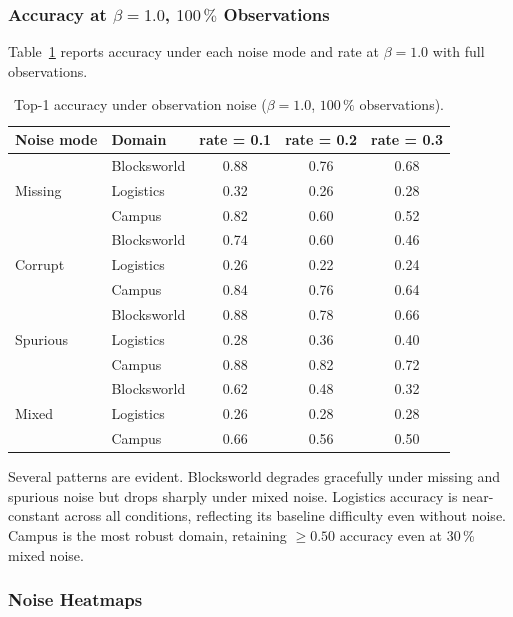 \documentclass[11pt,a4paper]{article}
\begin{document}
\subsubsection{Accuracy at $\beta = 1.0$, $100\,\%$ Observations}

Table~\ref{tab:noise_accuracy} reports accuracy under each noise mode
and rate at $\beta = 1.0$ with full observations.

\begin{table}[H]
\centering
\caption{Top-1 accuracy under observation noise ($\beta = 1.0$, $100\,\%$ observations).}
\label{tab:noise_accuracy}
\setlength{\tabcolsep}{5pt}
\begin{tabular}{llccc}
\toprule
\textbf{Noise mode} & \textbf{Domain} & \textbf{rate = 0.1} & \textbf{rate = 0.2} & \textbf{rate = 0.3} \\
\midrule
\multirow{3}{*}{Missing}
  & Blocksworld & 0.88 & 0.76 & 0.68 \\
  & Logistics   & 0.32 & 0.26 & 0.28 \\
  & Campus      & 0.82 & 0.60 & 0.52 \\
\midrule
\multirow{3}{*}{Corrupt}
  & Blocksworld & 0.74 & 0.60 & 0.46 \\
  & Logistics   & 0.26 & 0.22 & 0.24 \\
  & Campus      & 0.84 & 0.76 & 0.64 \\
\midrule
\multirow{3}{*}{Spurious}
  & Blocksworld & 0.88 & 0.78 & 0.66 \\
  & Logistics   & 0.28 & 0.36 & 0.40 \\
  & Campus      & 0.88 & 0.82 & 0.72 \\
\midrule
\multirow{3}{*}{Mixed}
  & Blocksworld & 0.62 & 0.48 & 0.32 \\
  & Logistics   & 0.26 & 0.28 & 0.28 \\
  & Campus      & 0.66 & 0.56 & 0.50 \\
\bottomrule
\end{tabular}
\end{table}

Several patterns are evident.  Blocksworld degrades gracefully under
missing and spurious noise but drops sharply under mixed noise.
Logistics accuracy is near-constant across all conditions, reflecting
its baseline difficulty even without noise.  Campus is the most
robust domain, retaining $\geq 0.50$ accuracy even at 30\,\% mixed noise.

\subsubsection{Noise Heatmaps}
\end{document}
